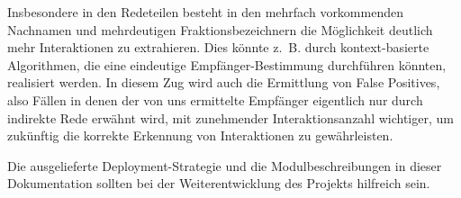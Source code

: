 Insbesondere in den Redeteilen besteht in den mehrfach vorkommenden Nachnamen
und mehrdeutigen Fraktionsbezeichnern die Möglichkeit deutlich mehr
Interaktionen zu extrahieren. Dies könnte z.~B. durch kontext-basierte
Algorithmen, die eine eindeutige Empfänger-Bestimmung durchführen könnten,
realisiert werden. In diesem Zug wird auch die Ermittlung von False Positives,
also Fällen in denen der von uns ermittelte Empfänger eigentlich nur durch
indirekte Rede erwähnt wird, mit zunehmender Interaktionsanzahl wichtiger, um
zukünftig die korrekte Erkennung von Interaktionen zu gewährleisten.

Die ausgelieferte Deployment-Strategie und die Modulbeschreibungen in dieser
Dokumentation sollten bei der Weiterentwicklung des Projekts hilfreich sein.
